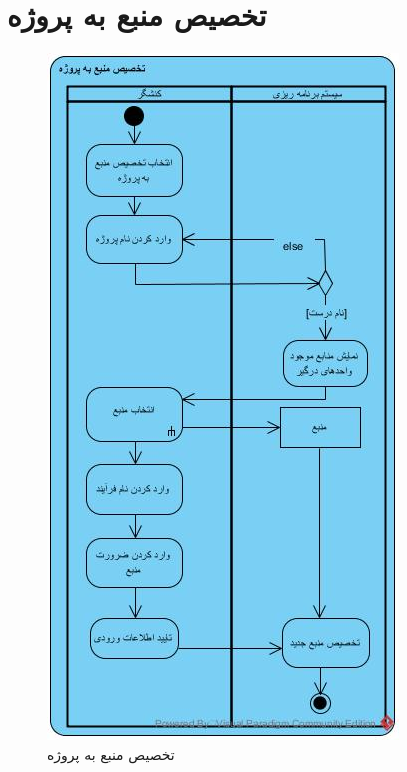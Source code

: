 \section{تخصیص منبع به پروژه}
\begin{figure}[H]
	\centering
	\includegraphics[scale=0.7]{img/activity/AllocateResourceToProject}
	\caption{تخصیص منبع به پروژه}
\end{figure}

